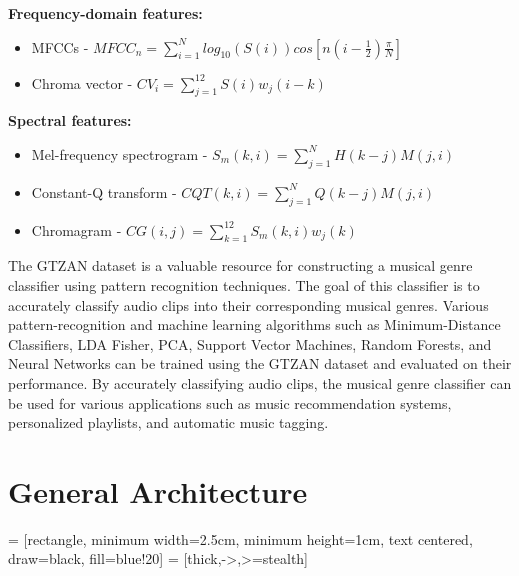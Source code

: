 \documentclass[12pt, a4paper]{article}
\begin{document}
\textbf{Frequency-domain features:}

\begin{itemize}
\item MFCCs - $MFCC_n = \sum_{i=1}^{N}log_{10}(S(i))cos[n(i-\frac{1}{2})\frac{\pi}{N}]$
\item Chroma vector - $CV_i = \sum_{j=1}^{12}S(i)w_j(i-k)$
\end{itemize}

\textbf{Spectral features:}

\begin{itemize}
\item Mel-frequency spectrogram - $S_m(k,i) = \sum_{j=1}^{N}H(k-j)M(j,i)$
\item Constant-Q transform - $CQT(k,i) = \sum_{j=1}^{N}Q(k-j)M(j,i)$
\item Chromagram - $CG(i,j) = \sum_{k=1}^{12}S_m(k,i)w_j(k)$
\end{itemize}


The GTZAN dataset is a valuable resource for constructing a musical genre classifier using pattern recognition techniques. The goal of this classifier is to accurately classify audio clips into their corresponding musical genres. Various pattern-recognition and machine learning algorithms such as Minimum-Distance Classifiers, LDA Fisher, PCA, Support Vector Machines, Random Forests, and Neural Networks can be trained using the GTZAN dataset and evaluated on their performance. By accurately classifying audio clips, the musical genre classifier can be used for various applications such as music recommendation systems, personalized playlists, and automatic music tagging.


\section{General Architecture}
\vspace{2cm}
 = [rectangle, minimum width=2.5cm, minimum height=1cm, text centered, draw=black, fill=blue!20]
 = [thick,->,>=stealth]
\end{document}
